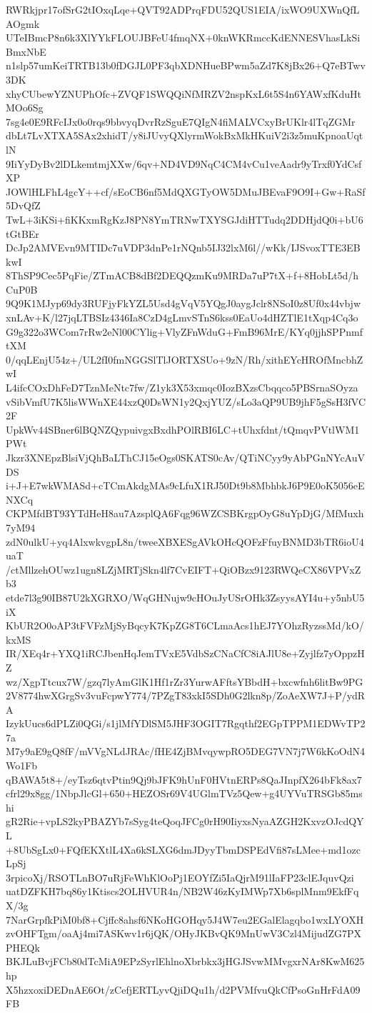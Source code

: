 RWRkjpr17ofSrG2tIOxqLqe+QVT92ADPrqFDU52QUS1EIA/ixWO9UXWnQfLAOgmk
UTeIBmcP8n6k3XlYYkFLOUJBFeU4fmqNX+0knWKRmccKdENNESVhasLkSiBmxNbE
n1slp57umKeiTRTB13b0fDGJL0PF3qbXDNHueBPwm5aZd7K8jBx26+Q7eBTwv3DK
xhyCUbewYZNUPhOfc+ZVQF1SWQQiNfMRZV2nspKxL6t5S4n6YAWxfKduHtMOo6Sg
7sg4e0E9RFcIJx0o0rqs9bbvyqDvrRzSguE7QIgN4fiMALVCxyBrUKlr4lTqZGMr
dbLt7LvXTXA5SAx2xhidT/y8iJUvyQXlyrmWokBxMkHKuiV2i3z5muKpnoaUqtlN
9IiYyDyBv2lDLkemtmjXXw/6qv+ND4VD9NqC4CM4vCu1veAadr9yTrxf0YdCsfXP
JOWlHLFhL4gcY++cf/sEoCB6nf5MdQXGTyOW5DMuJBEvaF9O9I+Gw+RaSf5DvQfZ
TwL+3iKSi+fiKKxmRgKzJ8PN8YmTRNwTXYSGJdiHTTudq2DDHjdQ0i+bU6tGtBEr
DcJp2AMVEvn9MTIDc7uVDP3dnPe1rNQnb5IJ32lxM6l//wKk/IJSvoxTTE3EBkwI
8ThSP9Cec5PqFie/ZTmACB8dBf2DEQQzmKu9MRDa7uP7tX+f+8HobLt5d/hCuP0B
9Q9K1MJyp69dy3RUFjyFkYZL5Usd4gVqV5YQgJ0aygJclr8NSoI0z8Uf0x44vbjw
xnLAv+K/l27jqLTBSIz4346Ia8CzD4gLmvSTnS6kss0EaUo4dHZTlE1tXqp4Cq3o
G9g322o3WCom7rRw2eNl00CYlig+VlyZFnWduG+FmB96MrE/KYq0jjhSPPnmftXM
0/qqLEnjU54z+/UL2fI0fmNGGSlTlJORTXSUo+9zN/Rh/xithEYcHROfMncbhZwI
L4ifcCOxDhFeD7TznMeNtc7fw/Z1yk3X53xmqc0IozBXzsCbqqco5PBSrnaSOyza
vSibVmfU7K5lisWWnXE44xzQ0DsWN1y2QxjYUZ/sLo3aQP9UB9jhF5gSsH3fVC2F
UpkWv44SBner6lBQNZQypuivgxBxdhPOlRBI6LC+tUhxfdnt/tQmqvPVtlWM1PWt
Jkzr3XNEpzBlsiVjQhBaLThCJ15eOgs0SKATS0cAv/QTiNCyy9yAbPGnNYcAuVDS
i+J+E7wkWMASd+cTCmAkdgMAs9cLfuX1RJ50Dt9b8MbhbkJ6P9E0oK5056eENXCq
CKPMfdBT93YTdHeH8au7AzsplQA6Fqg96WZCSBKrgpOyG8uYpDjG/MfMuxh7yM94
zdN0ulkU+yq4AlxwkvgpL8n/tweeXBXESgAVkOHcQOFzFfuyBNMD3bTR6ioU4uaT
/ctMllzehOUwz1ugn8LZjMRTjSkn4lf7CvEIFT+QiOBzx9123RWQeCX86VPVxZb3
etde7l3g90IB87U2kXGRXO/WqGHNujw9cHOuJyUSrOHk3ZsyysAYI4u+y5nbU5iX
KbUR2O0oAP3tFVFzMjSyBqcyK7KpZG8T6CLmaAcs1hEJ7YOhzRyzssMd/kO/kxMS
IR/XEq4r+YXQ1iRCJbenHqJemTVxE5VdbSzCNaCfC8iAJlU8e+Zyjlfz7yOppzHZ
wz/XgpTtcux7W/gzq7lyAmGlK1Hf1rZr3YurwAFftsYBbdH+bxcwfnh6litBw9PG
2V8774hwXGrgSv3vuFcpwY774/7PZgT83xkI5SDh0G2lkn8p/ZoAeXW7J+P/ydRA
IzykUucs6dPLZi0QGi/s1jlMfYDlSM5JHF3OGIT7Rgqthf2EGpTPPM1EDWvTP27a
M7y9aE9gQ8fF/mVVgNLdJRAc/fHE4ZjBMvqywpRO5DEG7VN7j7W6kKoOdN4Wo1Fb
qBAWA5t8+/eyTsz6qtvPtin9Qj9bJFK9hUnF0HVtnERPs8QaJInpfX264bFk8ax7
cfrl29x8gg/1NbpJlcGl+650+HEZOSr69V4UGlmTVz5Qew+g4UYVuTRSGb85mshi
gR2Rie+vpLS2kyPBAZYb7sSyg4teQoqJFCg0rH90IiyxsNyaAZGH2KxvzOJcdQYL
+8UbSgLx0+FQfEKXtlL4Xa6kSLXG6dmJDyyTbmDSPEdVfi87sLMee+md1ozcLpSj
3rpicoXj/RSOTLnBO7uRjFeWhKlOoPj1EOYfZi5IaQjrM91lIaFP23clEJquvQzi
uatDZFKH7bq86y1Ktiscs2OLHVUR4n/NB2W46zKyIMWp7Xb6splMnm9EkfFqX/3g
7NarGrpfkPiM0bf8+Cjffc8ahsf6NKoHGOHqy5J4W7eu2EGalElagqbo1wxLYOXH
zvOHFTgm/oaAj4mi7ASKwv1r6jQK/OHyJKBvQK9MnUwV3Czl4MijudZG7PXPHEQk
BKJLuBvjFCb80dTcMiA9EPzSyrlEhlnoXbrbkx3jHGJSvwMMvgxrNAr8KwM625hp
X5hzxoxiDEDnAE6Ot/zCefjERTLyvQjiDQu1h/d2PVMfvuQkCfPsoGnHrFdA09FB
